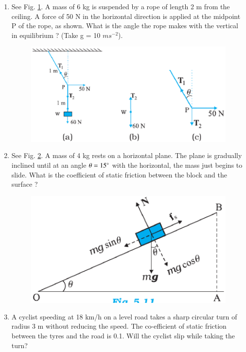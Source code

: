 \begin{enumerate}[label=\arabic*.,ref=\thesubsection.\theenumi]
\item See Fig. \ref{fig:5.8}. A mass of 6 kg is suspended by a rope of length 2 m from the ceiling. A force of 50 N in the horizontal direction is applied at the midpoint P of the rope, as shown. What is the angle the rope makes with the vertical in equilibrium ? (Take g = 10 $m s^{-2}$).
\begin{figure}[!ht]
\centering
\includegraphics[width=\columnwidth]{./figs/11-1/5/5.8.eps}
\caption{}
\label{fig:5.8}
\end{figure} 
\item See Fig. \ref{fig:5.11}. A mass of 4 kg rests on a horizontal plane. The plane is gradually inclined until at an angle $\theta = 15\degree$ with the horizontal, the mass just begins to slide. What is the coefficient of static friction between the block and the surface ?
\begin{figure}[!ht]
\centering
\includegraphics[width=\columnwidth]{./figs/11-1/5/5.11.eps}
\caption{}
\label{fig:5.11}
\end{figure} 
\item A cyclist speeding at 18 km/h on a level road takes a sharp circular turn of radius 3 m without reducing the speed. The co-efficient of static friction between the tyres and the road is 0.1. Will the cyclist slip while taking the turn?

\end{enumerate}
